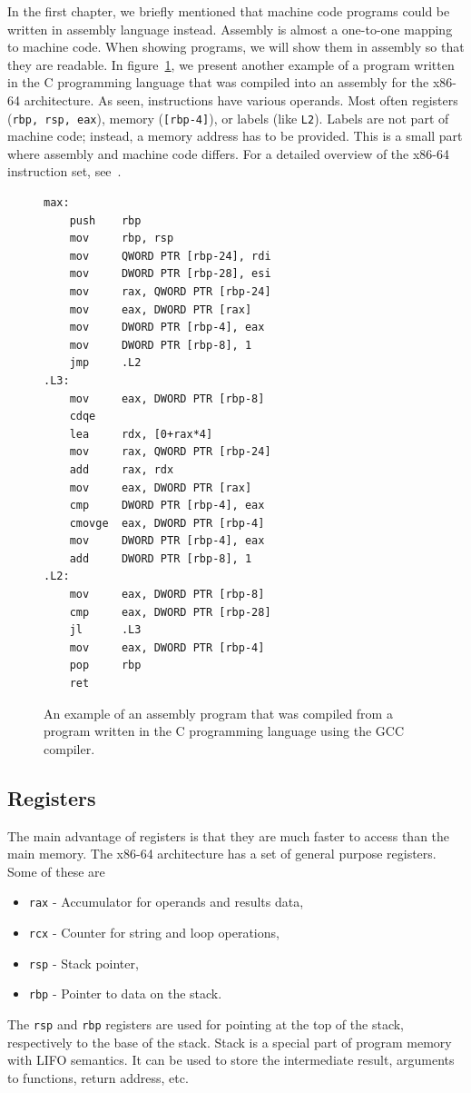 In the first chapter, we briefly mentioned that machine code programs could be
written in assembly language instead. Assembly is almost a one-to-one mapping
to machine code. When showing programs, we will show them in assembly so that
they are readable. In figure~\ref{fig:assembly-example2}, we present another
example of a program written in the C programming language that was compiled
into an assembly for the x86-64 architecture. As seen, instructions have
various operands. Most often registers (\texttt{rbp, rsp, eax}), memory
(\texttt{[rbp-4]}), or labels (like \texttt{L2}). Labels are not part of
machine code; instead, a memory address has to be provided. This is a small
part where assembly and machine code differs. For a detailed overview of the
x86-64 instruction set, see~\cite{intel-manual}.

\begin{figure}
    \begin{lstlisting}
max:
    push    rbp
    mov     rbp, rsp
    mov     QWORD PTR [rbp-24], rdi
    mov     DWORD PTR [rbp-28], esi
    mov     rax, QWORD PTR [rbp-24]
    mov     eax, DWORD PTR [rax]
    mov     DWORD PTR [rbp-4], eax
    mov     DWORD PTR [rbp-8], 1
    jmp     .L2
.L3:
    mov     eax, DWORD PTR [rbp-8]
    cdqe
    lea     rdx, [0+rax*4]
    mov     rax, QWORD PTR [rbp-24]
    add     rax, rdx
    mov     eax, DWORD PTR [rax]
    cmp     DWORD PTR [rbp-4], eax
    cmovge  eax, DWORD PTR [rbp-4]
    mov     DWORD PTR [rbp-4], eax
    add     DWORD PTR [rbp-8], 1
.L2:
    mov     eax, DWORD PTR [rbp-8]
    cmp     eax, DWORD PTR [rbp-28]
    jl      .L3
    mov     eax, DWORD PTR [rbp-4]
    pop     rbp
    ret
    \end{lstlisting}
    \caption{An example of an assembly program that was compiled from a program
    written in the C programming language using the GCC compiler.}
    \label{fig:assembly-example2}
\end{figure}

\subsection*{Registers}\label{subsection:registers}

The main advantage of registers is that they are much faster to access than the
main memory. The x86-64 architecture has a set of general purpose registers.
Some of these are
\begin{itemize}
    \item \texttt{rax} - Accumulator for operands and results data,
    \item \texttt{rcx} - Counter for string and loop operations,
    \item \texttt{rsp} - Stack pointer,
    \item \texttt{rbp} - Pointer to data on the stack.
\end{itemize}
The \texttt{rsp} and \texttt{rbp} registers are used for pointing at the top of
the stack, respectively to the base of the stack. Stack is a special part of
program memory with LIFO semantics. It can be used to store the intermediate
result, arguments to functions, return address, etc.

